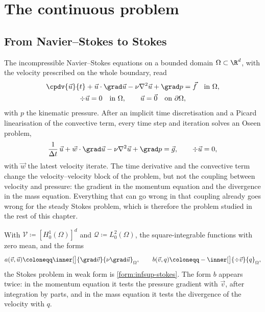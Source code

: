 \section{The continuous problem}\label{sec:infsup-continuous}

\subsection{From Navier--Stokes to Stokes}

The incompressible Navier--Stokes equations on a bounded domain $\Omega \subset \R^d$, with the velocity prescribed on the whole boundary, read
\begin{subequations}\label{eq:infsup-ns}
\begin{gather}
    \cpdv{\vec{u}}{t} + \vec{u} \cdot \grad\vec{u} - \nu \nabla^2 \vec{u} + \grad p = \vec{f}
    \quad \text{in } \Omega , \label{eq:infsup-ns-momentum} \\
    \div\vec{u} = 0 \quad \text{in } \Omega , \qquad \vec{u} = \vec{0} \quad \text{on } \partial\Omega , \label{eq:infsup-ns-mass}
\end{gather}
\end{subequations}
with $p$ the kinematic pressure. After an implicit time discretisation and a Picard linearisation of the convective term, every time step and iteration solves an Oseen problem,
\begin{equation*}
    \frac{1}{\Delta t}\, \vec{u} + \vec{w} \cdot \grad\vec{u} - \nu \nabla^2 \vec{u} + \grad p = \vec{g} , \qquad \div\vec{u} = 0 ,
\end{equation*}
with $\vec{w}$ the latest velocity iterate. The time derivative and the convective term change the velocity--velocity block of the problem, but not the coupling between velocity and pressure: the gradient in the momentum equation and the divergence in the mass equation. Everything that can go wrong in that coupling already goes wrong for the steady Stokes problem, which is therefore the problem studied in the rest of this chapter.

With $\mathcal{V} \coloneqq [H^1_0(\Omega)]^d$ and $\mathcal{Q} \coloneqq L^2_0(\Omega)$, the square-integrable functions with zero mean, and the forms
\begin{equation}\label{eq:infsup-forms}
    a(\vec{v}, \vec{u}) \coloneqq \inner[\big]{\grad\vec{v}}{\nu \grad\vec{u}}_\Omega ,
    \qquad
    b(\vec{v}, q) \coloneqq -\inner[\big]{\div\vec{v}}{q}_\Omega ,
\end{equation}
the Stokes problem in weak form is \cref{form:infsup-stokes}. The form $b$ appears twice: in the momentum equation it tests the pressure gradient with $\vec{v}$, after integration by parts, and in the mass equation it tests the divergence of the velocity with $q$.

